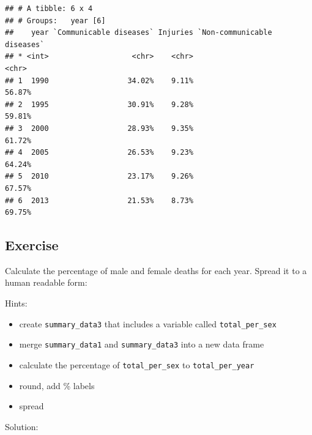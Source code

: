 \documentclass[]{book}
\makeatletter
\newenvironment{Shaded}{\begin{snugshade}}{\end{snugshade}}
\newcommand{\KeywordTok}[1]{\textcolor[rgb]{0.13,0.29,0.53}{\textbf{#1}}}
\newcommand{\DataTypeTok}[1]{\textcolor[rgb]{0.13,0.29,0.53}{#1}}
\newcommand{\StringTok}[1]{\textcolor[rgb]{0.31,0.60,0.02}{#1}}
\newcommand{\OperatorTok}[1]{\textcolor[rgb]{0.81,0.36,0.00}{\textbf{#1}}}
\newcommand{\NormalTok}[1]{#1}
\providecommand{\tightlist}{%
  \setlength{\itemsep}{0pt}\setlength{\parskip}{0pt}}
\newenvironment{kframe}{%
\medskip{}
\setlength{\fboxsep}{.8em}
 \def\at@end@of@kframe{}%
 \ifinner\ifhmode%
  \def\at@end@of@kframe{\end{minipage}}%
  \begin{minipage}{\columnwidth}%
 \fi\fi%
 \def\FrameCommand##1{\hskip\@totalleftmargin \hskip-\fboxsep
 \colorbox{shadecolor}{##1}\hskip-\fboxsep
     \hskip-\linewidth \hskip-\@totalleftmargin \hskip\columnwidth}%
 \MakeFramed {\advance\hsize-\width
   \@totalleftmargin\z@ \linewidth\hsize
   \@setminipage}}%
 {\par\unskip\endMakeFramed%
 \at@end@of@kframe}
\renewenvironment{Shaded}{\begin{kframe}}{\end{kframe}}
\makeatother
\begin{document}
\begin{verbatim}
## # A tibble: 6 x 4
## # Groups:   year [6]
##    year `Communicable diseases` Injuries `Non-communicable diseases`
## * <int>                   <chr>    <chr>                       <chr>
## 1  1990                  34.02%    9.11%                      56.87%
## 2  1995                  30.91%    9.28%                      59.81%
## 3  2000                  28.93%    9.35%                      61.72%
## 4  2005                  26.53%    9.23%                      64.24%
## 5  2010                  23.17%    9.26%                      67.57%
## 6  2013                  21.53%    8.73%                      69.75%
\end{verbatim}

\subsection{Exercise}\label{exercise-19}

Calculate the percentage of male and female deaths for each year. Spread
it to a human readable form:

Hints:

\begin{itemize}
\tightlist
\item
  create \texttt{summary\_data3} that includes a variable called
  \texttt{total\_per\_sex}
\item
  merge \texttt{summary\_data1} and \texttt{summary\_data3} into a new
  data frame
\item
  calculate the percentage of \texttt{total\_per\_sex} to
  \texttt{total\_per\_year}
\item
  round, add \% labels
\item
  spread
\end{itemize}

Solution:

\begin{Shaded}
\end{Shaded}
\end{document}
